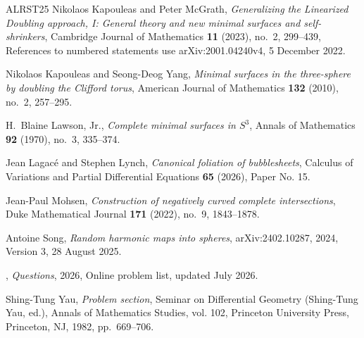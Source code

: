 \documentclass[a4paper,11pt,oneside,reqno]{amsart}
\numberwithin{equation}{section}
\theoremstyle{definition}
\begin{document}
\begin{thebibliography}{ALRST25}
Nikolaos Kapouleas and Peter McGrath, \emph{Generalizing the {Linearized Doubling} approach, {I}: General theory and new minimal surfaces and self-shrinkers}, Cambridge Journal of Mathematics \textbf{11} (2023), no.~2, 299--439, References to numbered statements use arXiv:2001.04240v4, 5 December 2022.

Nikolaos Kapouleas and Seong-Deog Yang, \emph{Minimal surfaces in the three-sphere by doubling the {Clifford} torus}, American Journal of Mathematics \textbf{132} (2010), no.~2, 257--295.

H.~Blaine Lawson, Jr., \emph{Complete minimal surfaces in {$S^3$}}, Annals of Mathematics \textbf{92} (1970), no.~3, 335--374.

Jean Lagac{\'e} and Stephen Lynch, \emph{Canonical foliation of bubblesheets}, Calculus of Variations and Partial Differential Equations \textbf{65} (2026), Paper No. 15.

Jean-Paul Mohsen, \emph{Construction of negatively curved complete intersections}, Duke Mathematical Journal \textbf{171} (2022), no.~9, 1843--1878.

Antoine Song, \emph{Random harmonic maps into spheres}, arXiv:2402.10287, 2024, Version 3, 28 August 2025.

\bysame, \emph{Questions}, 2026, Online problem list, updated July 2026.

Shing-Tung Yau, \emph{Problem section}, Seminar on Differential Geometry (Shing-Tung Yau, ed.), Annals of Mathematics Studies, vol. 102, Princeton University Press, Princeton, NJ, 1982, pp.~669--706.

\end{thebibliography}
\end{document}
